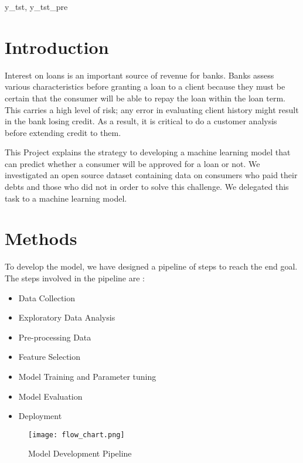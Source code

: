 y_tst, y_tst_pre\documentclass[12pt]{article}
\begin{document}
\section{Introduction} %

Interest on loans is an important source of revenue for banks. Banks assess various characteristics before granting a loan to a client because they must be certain that the consumer will be able to repay the loan within the loan term. This carries a high level of risk; any error in evaluating client history might result in the bank losing credit. As a result, it is critical to do a customer analysis before extending credit to them.

This Project explains the strategy to developing a machine learning model that can predict whether a consumer will be approved for a loan or not. We investigated an open source dataset containing data on consumers who paid their debts and those who did not in order to solve this challenge. We delegated this task to a machine learning model.


\section{Methods}
To develop the model, we have designed a pipeline of steps to reach the end goal. The steps involved in the pipeline are :


\begin{itemize}
  \item Data Collection
  \item Exploratory Data Analysis
  \item Pre-processing Data
  \item Feature Selection
  \item Model Training and Parameter tuning
  \item Model Evaluation
  \item Deployment
 \end{itemize}

\begin{figure}[h] %
\centering
\texttt{[image: flow\_chart.png]}
\caption{Model Development Pipeline}
\end{figure}
\end{document}
